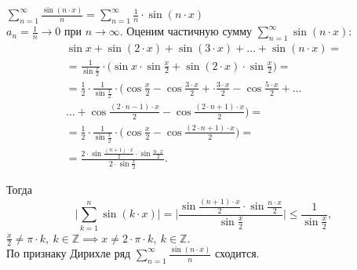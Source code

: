 \begin{example}
    $\sum_{n=1}^{\infty} \frac{\sin (n\cdot x)}{n} = \sum_{n=1}^{\infty} \frac{1}{n} \cdot \sin (n\cdot x)$ \\

    $a_n = \frac{1}{n}\rightarrow 0$ при $n\rightarrow\infty$. Оценим частичную сумму $\sum_{n=1}^{\infty}\sin (n\cdot x)$:
    \begin{multline*}
        \sin x + \sin (2\cdot x) + \sin (3\cdot x) + \ldots + \sin (n\cdot x) = \\
        = \frac{1}{\sin \frac{x}{2}} \cdot \bigg(\sin x \cdot \sin \frac{x}{2} + \sin (2\cdot x) \cdot \sin\frac{x}{2}\bigg) = \\
        = \frac{1}{2} \cdot \frac{1}{\sin\frac{x}{2}} \cdot \bigg(\cos \frac{x}{2} - \cos \frac{3\cdot x}{2} + \cdot \frac{3\cdot x}{2} - \cos \frac{5\cdot x}{2} + \ldots \\
        \ldots + \cos \frac{(2\cdot n-1)\cdot x}{2} - \cos \frac{(2\cdot n+1) \cdot x}{2}\bigg) = \\
        = \frac{1}{2} \cdot \frac{1}{\sin \frac{x}{2}} \cdot \bigg(\cos \frac{x}{2} - \cos \frac{(2\cdot n + 1) \cdot x}{2}\bigg) = \\
        = \frac{2\cdot \sin \frac{(n+1)\cdot x}{2} \cdot \sin \frac{n\cdot x}{2}}{2\cdot \sin \frac{x}{2}}.
    \end{multline*}

    Тогда
    \[
        \bigg|\sum_{k=1}^{n} \sin (k\cdot x)\bigg| = \bigg|\frac{\sin\frac{(n+1)\cdot x}{2}\cdot \sin \frac{n \cdot x}{2}}{\sin \frac{x}{2}}\bigg| \leqslant \frac{1}{\sin\frac{x}{2}},
    \]
    $\frac{x}{2} \ne \pi \cdot k, \ k \in \mathbb{Z} \implies x \ne 2 \cdot \pi \cdot k, \ k \in \mathbb{Z}$. \\

    По признаку Дирихле ряд $\sum_{n=1}^{\infty}\frac{\sin (n\cdot x)}{n}$ сходится.
\end{example}

\newpage
